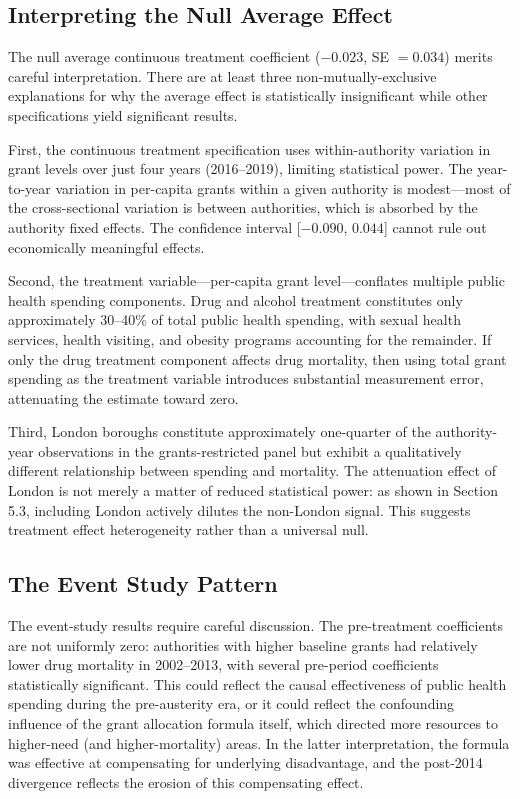 \documentclass[12pt]{article}
\begin{document}
\subsection{Interpreting the Null Average Effect}

The null average continuous treatment coefficient ($-0.023$, SE $= 0.034$) merits careful interpretation. There are at least three non-mutually-exclusive explanations for why the average effect is statistically insignificant while other specifications yield significant results.

First, the continuous treatment specification uses within-authority variation in grant levels over just four years (2016--2019), limiting statistical power. The year-to-year variation in per-capita grants within a given authority is modest---most of the cross-sectional variation is between authorities, which is absorbed by the authority fixed effects. The confidence interval [$-0.090$, $0.044$] cannot rule out economically meaningful effects.

Second, the treatment variable---per-capita grant level---conflates multiple public health spending components. Drug and alcohol treatment constitutes only approximately 30--40\% of total public health spending, with sexual health services, health visiting, and obesity programs accounting for the remainder. If only the drug treatment component affects drug mortality, then using total grant spending as the treatment variable introduces substantial measurement error, attenuating the estimate toward zero.

Third, London boroughs constitute approximately one-quarter of the authority-year observations in the grants-restricted panel but exhibit a qualitatively different relationship between spending and mortality. The attenuation effect of London is not merely a matter of reduced statistical power: as shown in Section 5.3, including London actively dilutes the non-London signal. This suggests treatment effect heterogeneity rather than a universal null.

\subsection{The Event Study Pattern}

The event-study results require careful discussion. The pre-treatment coefficients are not uniformly zero: authorities with higher baseline grants had relatively lower drug mortality in 2002--2013, with several pre-period coefficients statistically significant. This could reflect the causal effectiveness of public health spending during the pre-austerity era, or it could reflect the confounding influence of the grant allocation formula itself, which directed more resources to higher-need (and higher-mortality) areas. In the latter interpretation, the formula was effective at compensating for underlying disadvantage, and the post-2014 divergence reflects the erosion of this compensating effect.
\end{document}
